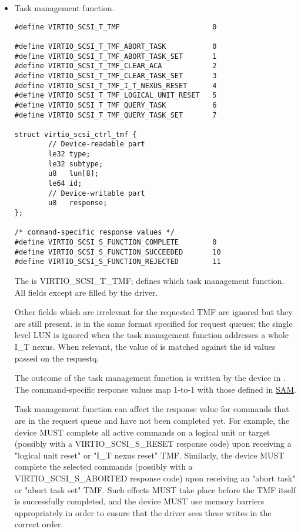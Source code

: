 \begin{itemize}
\item Task management function.
\begin{lstlisting}
#define VIRTIO_SCSI_T_TMF                      0

#define VIRTIO_SCSI_T_TMF_ABORT_TASK           0
#define VIRTIO_SCSI_T_TMF_ABORT_TASK_SET       1
#define VIRTIO_SCSI_T_TMF_CLEAR_ACA            2
#define VIRTIO_SCSI_T_TMF_CLEAR_TASK_SET       3
#define VIRTIO_SCSI_T_TMF_I_T_NEXUS_RESET      4
#define VIRTIO_SCSI_T_TMF_LOGICAL_UNIT_RESET   5
#define VIRTIO_SCSI_T_TMF_QUERY_TASK           6
#define VIRTIO_SCSI_T_TMF_QUERY_TASK_SET       7

struct virtio_scsi_ctrl_tmf {
        // Device-readable part
        le32 type;
        le32 subtype;
        u8   lun[8];
        le64 id;
        // Device-writable part
        u8   response;
};

/* command-specific response values */
#define VIRTIO_SCSI_S_FUNCTION_COMPLETE        0
#define VIRTIO_SCSI_S_FUNCTION_SUCCEEDED       10
#define VIRTIO_SCSI_S_FUNCTION_REJECTED        11
\end{lstlisting}

  The  is VIRTIO_SCSI_T_TMF;  defines which
  task management function. All
  fields except  are filled by the driver.

  Other fields which are irrelevant for the requested TMF
  are ignored but they are still present. 
  is in the same format specified for request queues; the
  single level LUN is ignored when the task management function
  addresses a whole I_T nexus. When relevant, the value of 
  is matched against the id values passed on the requestq.

  The outcome of the task management function is written by the
  device in . The command-specific response
  values map 1-to-1 with those defined in \hyperref[intro:SAM]{SAM}.

  Task management function can affect the response value for commands that
  are in the request queue and have not been completed yet.  For example,
  the device MUST complete all active commands on a logical unit
  or target (possibly with a VIRTIO_SCSI_S_RESET response code)
  upon receiving a "logical unit reset" or "I_T nexus reset" TMF.
  Similarly, the device MUST complete the selected commands (possibly
  with a VIRTIO_SCSI_S_ABORTED response code) upon receiving an "abort
  task" or "abort task set" TMF.  Such effects MUST take place before
  the TMF itself is successfully completed, and the device MUST use
  memory barriers appropriately in order to ensure that the driver sees
  these writes in the correct order.


\end{itemize}
